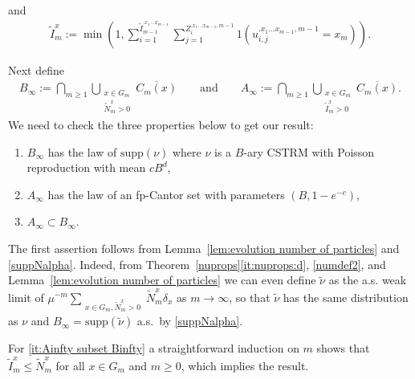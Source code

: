 \documentclass[12pt]{article}
\makeatletter
\renewenvironment{proof}[1][\proofname]{%
\par\pushQED{\qed}\normalfont%
\topsep6\p@\@plus6\p@\relax
\trivlist\item[\hskip\labelsep\bfseries#1\@addpunct{.}]%
\ignorespaces
}{%
\popQED\endtrivlist\@endpefalse
}
\numberwithin{theorem}{section}
\theoremstyle{def}
\numberwithin{equation}{section}
\newcommand{\supp}{\mathrm{supp}}
\makeatother
\begin{document}
\begin{proof}
\begin{itemize}
and
	\begin{align*}
		\widetilde{I}_m^x:=\min \left(1,\sum_{i=1}^{\widetilde{I}_{m-1}^{.x_1\dots x_{m-1}}}\sum_{j=1}^{Z_i^{.x_1\dots x_{m-1},m-1}} 1(u_{i,j}^{.x_1\dots x_{m-1},m-1}= x_m)\right).
	\end{align*} 
\end{itemize}
Next define 
\begin{align*}
	B_\infty := \bigcap_{m\geq 1} \bigcup_{\substack{x\in G_m\\\widetilde{N}_m^x>0}}\overline{C_m(x)} \qquad \text{and} \qquad  A_\infty := \bigcap_{m\geq 1} \bigcup_{\substack{x\in G_m\\\widetilde{I}_m^x>0}}\overline{C_m(x)}.
\end{align*}
We need to check the three properties below to get our result:
\begin{enumerate}[label=(\alph*), ref=(\alph*)]
	\item\label{it:Binfty is a strm} $B_\infty$ has the law of $\supp(\nu)$ where $\nu$ is a $B$-ary CSTRM with Poisson reproduction with mean $cB^d$,
	\item\label{it:Ainfty is a fp cantor set} $A_\infty$ has the law of an fp-Cantor set with parameters $(B,1-e^{-c})$,
	\item \label{it:Ainfty subset Binfty}$A_\infty\subset B_\infty$.  
\end{enumerate}
The first assertion follows from Lemma~\ref{lem:evolution number of particles} and \eqref{suppNalpha}. 
Indeed, from Theorem~\ref{nuprops}\ref{it:nuprops:d}, \eqref{numdef2}, and Lemma~\ref{lem:evolution number of particles} we can even define $\tilde{\nu}$ as the a.s. weak limit of $\mu^{-m}\sum_{\substack{x\in G_m, \widetilde N_m^x>0}} \widetilde N_m^x \delta_{x}$ as $m\rightarrow \infty$, so that $\tilde{\nu}$ has the same distribution as $\nu$ and $B_\infty=\supp(\tilde{\nu})$ a.s.\ by \eqref{suppNalpha}.

For \ref{it:Ainfty subset Binfty} a straightforward induction on $m$ shows that $\widetilde{I}_m^x\leq \widetilde{N}_m^x$ for all $x\in G_m$ and $m\geq 0$, which implies the result.


\end{proof}
\end{document}
